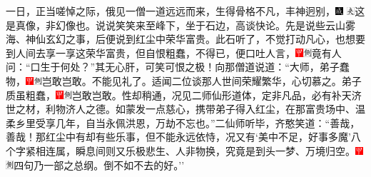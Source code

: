 一日，正当嗟悼之际，俄见一僧一道远远而来，生得骨格不凡，丰神迥别，{\includegraphics[width=3mm]{../Images/00005} \includegraphics[width=3mm]{../Images/00012}\footnotesize   这是真像，非幻像也。}说说笑笑来至峰下，坐于石边，高谈快论。先是说些云山雾海、神仙玄幻之事，后便说到红尘中荣华富贵。此石听了，不觉打动凡心，也想要到人间去享一享这荣华富贵，但自恨粗蠢，不得已，便口吐人言，{\includegraphics[width=3mm]{../Images/00002}\includegraphics[width=3mm]{../Images/00011}\footnotesize 竟有人问：``口生于何处？''其无心肝，可笑可恨之极！}向那僧道说道：``大师，弟子蠢物，{\includegraphics[width=3mm]{../Images/00002}\includegraphics[width=3mm]{../Images/00011}\footnotesize 岂敢岂敢。}不能见礼了。适闻二位谈那人世间荣耀繁华，心切慕之。弟子质虽粗蠢，{\includegraphics[width=3mm]{../Images/00002}\includegraphics[width=3mm]{../Images/00011}\footnotesize 岂敢岂敢。}性却稍通，况见二师仙形道体，定非凡品，必有补天济世之材，利物济人之德。如蒙发一点慈心，携带弟子得入红尘，在那富贵场中、温柔乡里受享几年，自当永佩洪恩，万劫不忘也。''二仙师听毕，齐憨笑道：``善哉，善哉！那红尘中有却有些乐事，但不能永远依恃，况又有`美中不足，好事多魔'八个字紧相连属，瞬息间则又乐极悲生、人非物换，究竟是到头一梦、万境归空。{\includegraphics[width=3mm]{../Images/00002}\includegraphics[width=3mm]{../Images/00011}\footnotesize 四句乃一部之总纲。}倒不如不去的好。''

